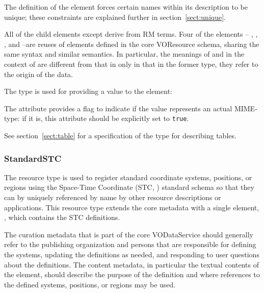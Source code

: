 \documentclass[11pt,a4paper]{ivoa}
\begin{document}

The definition of the  element forces certain
names within its description to be unique; these constraints are explained
further in section~\ref{sect:unique}.



All of the child elements except  derive
from RM terms.  Four of the elements -- , 
, ,
and --are reuses of elements defined in 
the core VOResource schema, sharing the same syntax and similar
semantics.  In particular, the meanings of 
and  in the context of 
 are different from that in 
 only in that in the former type, they refer
to the origin of the data.  



The  type is used for
providing a value to the  element:




The  attribute
provides a flag to indicate if the value represents an actual
MIME-type: if it is, this attribute should be explicitly set to
\texttt{true}.




See section~\ref{sect:table} for a specification of
the  type for describing tables.  


\subsubsection{StandardSTC}
\label{sect:standardstc}


The  resource type is used to register standard
coordinate systems, positions, or regions using the Space-Time
Coordinate (STC, \citep{STC}) standard schema so that
they can by uniquely referenced by name by other resource descriptions
or applications.  This resource type extends the core metadata with a
single element, , which contains
the STC definitions.  





The curation metadata that is part of the core VODataService should
generally refer to the publishing organization and persons that are
responsible for defining the systems, updating the definitions as
needed, and responding to user questions about the definitions.  The
content metadata, in particular the textual contents of the
 element, should describe the purpose
of the definition and where references to the defined systems,
positions, or regions may be used.  
\end{document}
